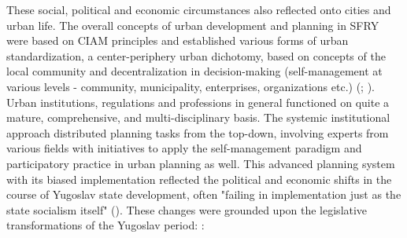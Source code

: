 \documentclass[11pt]{report}
\begin{document}
These social, political and economic circumstances also reflected onto cities and urban life. The overall concepts of urban development and planning in SFRY were based on CIAM principles and established various forms of urban standardization, a center-periphery urban dichotomy, based on concepts of the local community and decentralization in decision-making (self-management at various levels - community, municipality, enterprises, organizations etc.) (\href{Fisher}{\citealt{fisher_planning_1962}}; \href{Nedovic}{\citealt{nedovicbudic_waves_2006}}).
Urban institutions, regulations and professions in general functioned on quite a mature, comprehensive, and multi-disciplinary basis. The systemic institutional approach distributed planning tasks from the top-down, involving experts from various fields with initiatives to apply the self-management paradigm and participatory practice in urban planning as well.  This advanced planning system with its biased implementation reflected the political and economic shifts in the course of Yugoslav state development, often "failing in implementation just as the state socialism itself" (\href{Nedovic}{\citealt{nedovicbudic_waves_2006}}). These changes were grounded upon the legislative transformations of the Yugoslav period: \href{Nedovic}{\citealt{nedovicbudic_waves_2006}}:
\end{document}
